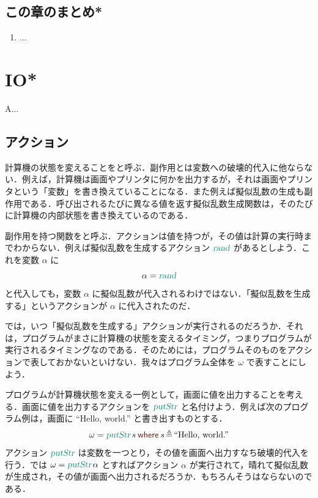 \documentclass[a5paper,twoside,fleqn,draft]{jsbook}
\begin{document}
\section{この章のまとめ*}

\begin{enumerate}
\item ...
\end{enumerate}


\chapter{IO*}
\label{ch:io}

A...

\section{アクション}

計算機の状態を変えることをと呼ぶ．副作用とは変数への破壊的代入に他ならない．例えば，計算機は画面やプリンタに何かを出力するが，それは画面やプリンタという「変数」を書き換えていることになる．また例えば擬似乱数の生成も副作用である．呼び出されるたびに異なる値を返す擬似乱数生成関数は，そのたびに計算機の内部状態を書き換えているのである．

副作用を持つ関数をと呼ぶ．アクションは値を持つが，その値は計算の実行時までわからない．例えば擬似乱数を生成するアクション $\mRand$ があるとしよう．これを変数 $\alpha$ に
\begin{equation}
\alpha=\mRand
\end{equation}
と代入しても，変数 $\alpha$ に擬似乱数が代入されるわけではない．「擬似乱数を生成する」というアクションが $\alpha$ に代入されたのだ．

では，いつ「擬似乱数を生成する」アクションが実行されるのだろうか．それは，プログラムがまさに計算機の状態を変えるタイミング，つまりプログラムが実行されるタイミングなのである．そのためには，プログラムそのものをアクションで表しておかないといけない．我々はプログラム全体を $\omega$ で表すことにしよう．

プログラムが計算機状態を変える一例として，画面に値を出力することを考える．画面に値を出力するアクションを $\mPutStr$ と名付けよう．例えば次のプログラム例は，画面に ``Hello, world.'' と書き出すものとする．
\begin{equation}
\omega=\mPutStr s\mWhereIsEXP{s}{\mString{``Hello, world.''}}
\end{equation}
アクション $\mPutStr$ は変数を一つとり，その値を画面へ出力すなち破壊的代入を行う．では $\omega=\mPutStr\alpha$ とすればアクション $\alpha$ が実行されて，晴れて擬似乱数が生成され，その値が画面へ出力されるだろうか．もちろんそうはならないのである．
\end{document}
